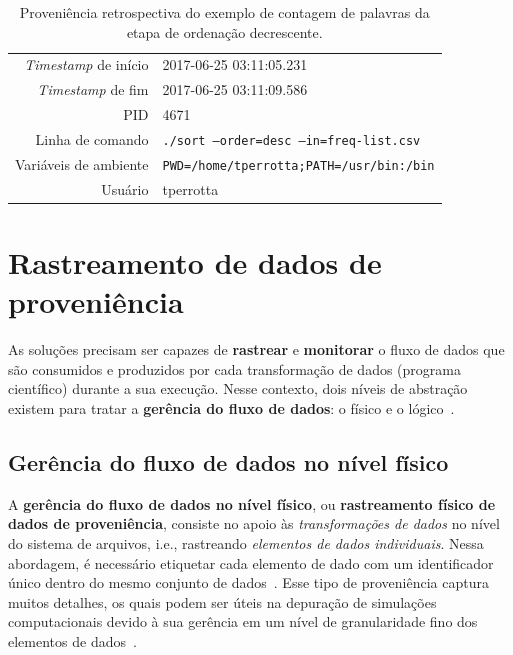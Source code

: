\begin{table}[ht]
    \centering
    \begin{tabular}{r|l}
        \hline
        \textit{Timestamp} de início & 2017-06-25 03:11:05.231                         \\
        \textit{Timestamp} de fim    & 2017-06-25 03:11:09.586                         \\
        PID                          & 4671                                            \\
        Linha de comando             & \texttt{./sort --order=desc --in=freq-list.csv} \\
        Variáveis de ambiente        & \texttt{PWD=/home/tperrotta;PATH=/usr/bin:/bin} \\
        Usuário                      & tperrotta                                       \\
        \hline
    \end{tabular}
    \caption[Proveniência retrospectiva do exemplo de contagem de palavras]{Proveniência retrospectiva do exemplo de contagem de palavras da etapa de ordenação decrescente.}%
    \label{tab:word-count-retrospective}
\end{table}

\section{Rastreamento de dados de proveniência}

As soluções precisam ser capazes de \textbf{rastrear} e \textbf{monitorar} o fluxo de dados que são consumidos e produzidos por cada transformação de dados (programa científico) durante a sua execução. Nesse contexto, dois níveis de abstração existem para tratar a \textbf{gerência do fluxo de dados}: o físico e o lógico~\cite{silva2015propostadoutorado}.

\subsection{Gerência do fluxo de dados no nível físico}%
\label{sec:gerencia-do-fluxo-de-dados-no-nivel-fisico}

A \textbf{gerência do fluxo de dados no nível físico}, ou \textbf{rastreamento físico de dados de proveniência}, consiste no apoio às \emph{transformações de dados} no nível do sistema de arquivos, i.e., rastreando \emph{elementos de dados individuais}. Nessa abordagem, é necessário etiquetar cada elemento de dado com um identificador único dentro do mesmo conjunto de dados~\cite{silva2015propostadoutorado}. Esse tipo de proveniência captura muitos detalhes, os quais podem ser úteis na depuração de simulações computacionais devido à sua gerência em um nível de granularidade fino dos elementos de dados~\cite{silva2017raw}.

